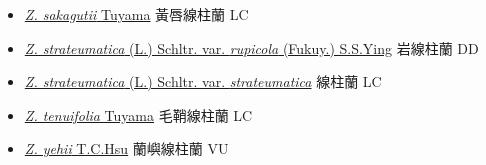 \begin{itemize}
\begin{itemize}
        \item[] \href{http://www.theplantlist.org/tpl1.1/search?q=Zeuxine+sakagutii}{\textit{Z. sakagutii} Tuyama}   黃唇線柱蘭 LC
        \item[] \href{http://www.theplantlist.org/tpl1.1/search?q=Zeuxine+strateumatica+var.+rupicola}{\textit{Z. strateumatica} (L.) Schltr. var. \textit{rupicola} (Fukuy.) S.S.Ying}   岩線柱蘭 DD
        \item[] \href{http://www.theplantlist.org/tpl1.1/search?q=Zeuxine+strateumatica+var.+strateumatica}{\textit{Z. strateumatica} (L.) Schltr. var. \textit{strateumatica}}   線柱蘭 LC
        \item[] \href{http://www.theplantlist.org/tpl1.1/search?q=Zeuxine+tenuifolia}{\textit{Z. tenuifolia} Tuyama}   毛鞘線柱蘭 LC
        \item[] \href{http://www.theplantlist.org/tpl1.1/search?q=Zeuxine+yehii}{\textit{Z. yehii} T.C.Hsu}   蘭嶼線柱蘭 VU
  \end{itemize}
  \end{itemize}
